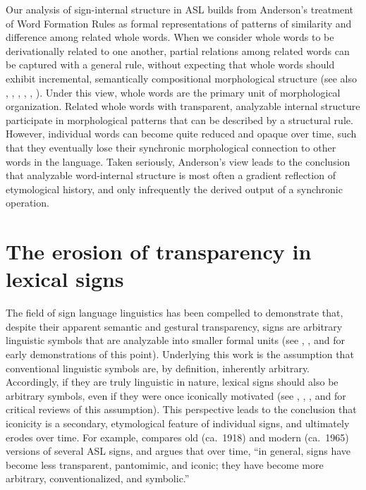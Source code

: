 \documentclass[output=paper,
modfonts
]{LSP/langsci}
\begin{document}
  Our analysis of sign-internal structure in ASL builds from Anderson's treatment of Word Formation Rules as formal representations of patterns of similarity and difference among related whole words. When we consider whole words to be derivationally related to one another, partial relations among related words can be captured with a general rule, without expecting that whole words should exhibit incremental, semantically compositional morphological structure (see also \citealt{Aronoff1976}, \citealt{Bochner1993},  \citealt{Hay2005}, \citealt{Aronoff2007}, \citealt{Blevins2016}, \citealt{Andersoninpress}). Under this view, whole words are the primary unit of morphological organization. Related whole words with transparent, analyzable internal structure participate in morphological patterns that can be described by a structural rule. However, individual words can become quite reduced and opaque over time, such that they eventually lose their synchronic morphological connection to other words in the language. Taken seriously, Anderson's view leads to the conclusion that analyzable word-internal structure is most often a gradient reflection of etymological history, and only infrequently the derived output of a synchronic operation.

\section{The erosion of transparency in lexical signs}\label{sec:2}

The field of sign language linguistics has been compelled to demonstrate that, despite their apparent semantic and gestural transparency, signs are arbitrary linguistic symbols that are analyzable into smaller formal units (see \citealt{Stokoe1960},  \citealt{Klima1979}, and \citealt{Supalla1986} for early demonstrations of this point). Underlying this work is the assumption that conventional linguistic symbols are, by definition, inherently arbitrary. Accordingly, if they are truly linguistic in nature, lexical signs should also be arbitrary symbols, even if they were once iconically motivated (see \citealt{Wilcox1995}, \citealt{Taub2001}, \citealt{Perniss2010}, and \citealt{Emmorey2014} for critical reviews of this assumption). This perspective leads to the conclusion that iconicity is a secondary, etymological feature of individual signs, and ultimately erodes over time. For example, \citet[718]{Frishberg1975} compares old (ca.\ 1918) and modern (ca.\ 1965) versions of several ASL signs, and argues that over time, ``in general, signs have become less transparent, pantomimic, and iconic; they have become more arbitrary, conventionalized, and symbolic.''
\end{document}
